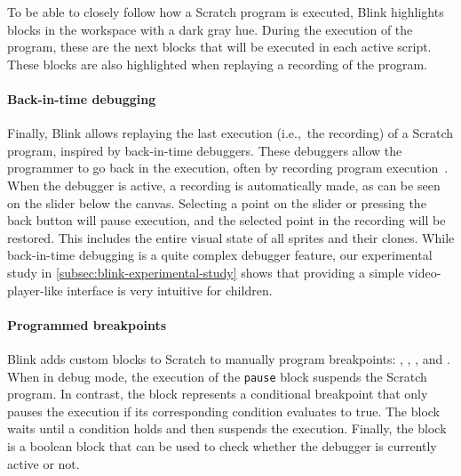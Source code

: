 \documentclass[../main]{subfiles}
\begin{document}
To be able to closely follow how a Scratch program is executed, Blink highlights blocks in the workspace with a dark gray hue.
During the execution of the program, these are the next blocks that will be executed in each active script.
These blocks are also highlighted when replaying a recording of the program.

\paragraph{Back-in-time debugging}
Finally, Blink allows replaying the last execution (i.e.,\ the recording) of a Scratch program, inspired by back-in-time debuggers.
These debuggers allow the programmer to go back in the execution, often by recording program execution~\autocite{barrTardisAffordableTimetravel2014a,barrTimetravelDebuggingJavaScript2016a,czaplickiAsynchronousFunctionalReactive2013a,balzerEXDAMSExtendableDebugging1969,ungarDebuggingExperienceImmediacy1997,chenReversibleDebuggingUsing2001,crescenziReversibleExecutionVisualization2000}.
When the debugger is active, a recording is automatically made, as can be seen on the slider below the canvas.
Selecting a point on the slider or pressing the back button will pause execution, and the selected point in the recording will be restored.
This includes the entire visual state of all sprites and their clones.
While back-in-time debugging is a quite complex debugger feature, our experimental study in \cref{subsec:blink-experimental-study} shows that providing a simple video-player-like interface is very intuitive for children.

\paragraph{Programmed breakpoints}
Blink adds custom blocks to Scratch to manually program breakpoints: , , , and .
When in debug mode, the execution of the \texttt{pause} block suspends the Scratch program.
In contrast, the  block represents a conditional breakpoint that only pauses the execution if its corresponding condition evaluates to true.
The  block waits until a condition holds and then suspends the execution.
Finally, the  block is a boolean block that can be used to check whether the debugger is currently active or not.
\end{document}
